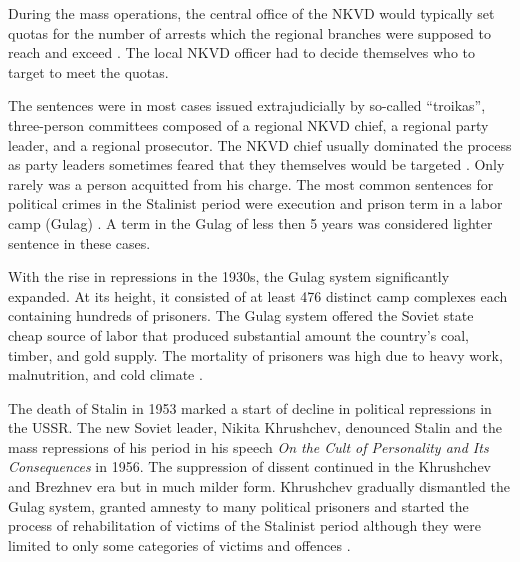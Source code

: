 During the mass operations, the central office of the NKVD would typically set quotas for the number of arrests which the regional branches were supposed to reach and exceed \citep[chapter 6]{gregory_terror_2009}. The local NKVD officer had to decide themselves who to target to meet the quotas. 

The sentences were in most cases issued extrajudicially by so-called \enquote{troikas}, three-person committees composed of a regional NKVD chief, a regional party leader, and a regional prosecutor. The NKVD chief usually dominated the process as party leaders sometimes feared that they themselves would be targeted \citep[p. 82]{snyder_bloodlands:_2011}. Only rarely was a person acquitted from his charge. 
The most common sentences for political crimes in the Stalinist period were  execution and prison term in a labor camp (Gulag) \citep[p. 21]{gregory_terror_2009}. 
A term in the Gulag of less then 5 years was considered lighter sentence in these cases.

 With the rise in  repressions in the 1930s, the Gulag system significantly expanded. At its height, it consisted of at least 476 distinct camp complexes each containing hundreds of prisoners. The Gulag system offered the Soviet state cheap source of labor that produced substantial amount the country's coal, timber, and gold supply. The mortality of prisoners was high due to heavy work, malnutrition, and cold climate \citep{applebaum_gulag:_2003}. 

The death of Stalin in 1953 marked a start of decline in political repressions in the USSR. The new Soviet leader, Nikita Khrushchev, denounced Stalin and the mass repressions of his period in his speech \emph{On the Cult of Personality and Its Consequences} in 1956. The suppression of dissent continued in the Khrushchev and  Brezhnev era but in much milder form. Khrushchev gradually dismantled the Gulag system, granted amnesty to many political prisoners and started the process of rehabilitation of victims of the Stalinist period although they were limited to only some categories of victims and offences \citep{applebaum_gulag:_2003, dobson_khrushchevs_2009}. 

